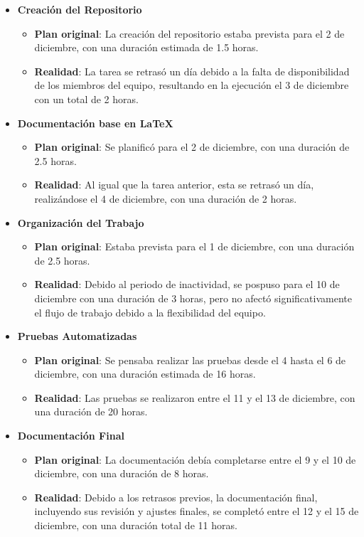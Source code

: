 \documentclass[stu, 12pt, letterpaper, donotrepeattitle, floatsintext, natbib]{apa7}
\begin{document}
\begin{itemize}
    \item \textbf{Creación del Repositorio}  
    \begin{itemize}
        \item \textbf{Plan original}: La creación del repositorio estaba prevista para el 2 de diciembre, con una duración estimada de 1.5 horas.
        \item \textbf{Realidad}: La tarea se retrasó un día debido a la falta de disponibilidad de los miembros del equipo, resultando en la ejecución el 3 de diciembre con un total de 2 horas.
    \end{itemize}

    \item \textbf{Documentación base en LaTeX}  
    \begin{itemize}
        \item \textbf{Plan original}: Se planificó para el 2 de diciembre, con una duración de 2.5 horas.
        \item \textbf{Realidad}: Al igual que la tarea anterior, esta se retrasó un día, realizándose el 4 de diciembre, con una duración de 2 horas.
    \end{itemize}

    \item \textbf{Organización del Trabajo}  
    \begin{itemize}
        \item \textbf{Plan original}: Estaba prevista para el 1 de diciembre, con una duración de 2.5 horas.
        \item \textbf{Realidad}: Debido al periodo de inactividad, se pospuso para el 10 de diciembre con una duración de 3 horas, pero no afectó significativamente el flujo de trabajo debido a la flexibilidad del equipo.
    \end{itemize}

    \item \textbf{Pruebas Automatizadas}  
    \begin{itemize}
        \item \textbf{Plan original}: Se pensaba realizar las pruebas desde el 4 hasta el 6 de diciembre, con una duración estimada de 16 horas.
        \item \textbf{Realidad}: Las pruebas se realizaron entre el 11 y el 13 de diciembre, con una duración de 20 horas.
    \end{itemize}

    \item \textbf{Documentación Final}  
    \begin{itemize}
        \item \textbf{Plan original}: La documentación debía completarse entre el 9 y el 10 de diciembre, con una duración de 8 horas.
        \item \textbf{Realidad}: Debido a los retrasos previos, la documentación final, incluyendo sus revisión y ajustes finales, se completó entre el 12 y el 15 de diciembre, con una duración total de 11 horas.
    \end{itemize}
\end{itemize}
\end{document}
